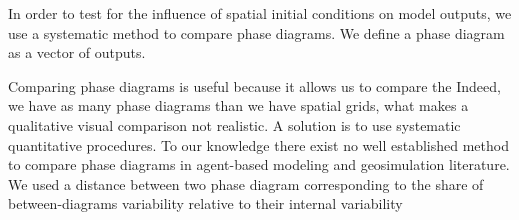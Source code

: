 \documentclass[Afour,sageh,times]{sagej}
\begin{document}
In order to test for the influence of spatial initial conditions on model outputs, we use a systematic method to compare phase diagrams. We define a phase diagram as a vector of  outputs. 

Comparing phase diagrams is useful because it allows us to compare the 
Indeed, we have as many phase diagrams than we have spatial grids, what makes a qualitative visual comparison not realistic. A solution is to use systematic quantitative procedures. To our knowledge there exist no well established method to compare phase diagrams in agent-based modeling and geosimulation literature. We used a distance between two phase diagram corresponding to the share of between-diagrams variability relative to their internal variability



\end{document}
